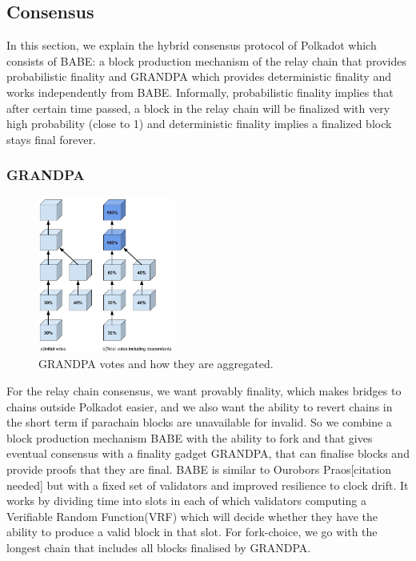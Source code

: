 \subsection{Consensus}\label{sec:consensus}

In this section, we explain the hybrid consensus protocol of Polkadot which consists of BABE: a block production mechanism of the relay chain that provides probabilistic finality and GRANDPA which provides deterministic finality and works independently from BABE.  Informally, probabilistic finality implies that after certain time passed, a block in the relay chain will be finalized with very high probability (close to 1) and deterministic finality implies a finalized block stays final forever.




\subsubsection{GRANDPA} \label{sec:grandpa}
\begin{figure}[h!]
  \centering
  \includegraphics[width=0.4\textwidth]{images/Grandpa.jpg}
  \caption{GRANDPA votes and how they are aggregated.}
    \label{fig:grandpa}
\end{figure}
For the relay chain consensus, we want provably finality, which makes bridges to chains outside Polkadot easier, and we also want the ability to revert chains in the short term if parachain blocks are unavailable for invalid.
So we combine a block production mechanism BABE with the ability to fork and that gives eventual consensus with a finality gadget GRANDPA, that can finalise blocks and provide proofs that they are final.
BABE is similar to Ourobors Praos[citation needed] but with a fixed set of validators and improved resilience to clock drift.
It works by dividing time into slots in each of which validators computing a Verifiable Random Function(VRF) which will decide whether they have the ability to produce a valid block in that slot.
For fork-choice, we go with the longest chain that includes all blocks finalised by GRANDPA.
